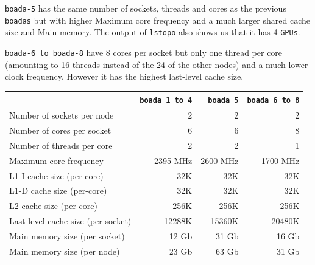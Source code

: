 \texttt{boada-5} has the same number of sockets, threads and cores as the previous \texttt{boadas} but with higher Maximum core frequency and a much larger shared cache size and Main memory.
The output of \texttt{lstopo} also shows us that it has 4 \texttt{GPUs}.

\texttt{boada-6 to boada-8} have 8 cores per socket but only one thread per core (amounting to 16 threads instead of the 24 of the other nodes) and a much lower clock frequency. However it has the
highest last-level cache size.

\begin{table}[H]%
    \label{tab:node_arch_and_mem}
    \centering
    \begin{tabular}{lrrr}

    \toprule
        & \texttt{boada 1 to 4} & \texttt{boada 5} & \texttt{boada 6 to 8} \\
    \midrule
        Number of sockets per node          & 2        & 2        & 2        \\
        Number of cores per socket          & 6        & 6        & 8        \\
        Number of threads per core          & 2        & 2        & 1        \\
        Maximum core frequency              & 2395 MHz & 2600 MHz & 1700 MHz \\
    \addlinespace[1em]
        L1-I cache size (per-core)          & 32K      & 32K      & 32K      \\
        L1-D cache size (per-core)          & 32K      & 32K      & 32K      \\
        L2 cache size (per-core)            & 256K     & 256K     & 256K     \\
        Last-level cache size (per-socket)  & 12288K   & 15360K   & 20480K   \\
    \addlinespace[1em]
        Main memory size (per socket)       & 12 Gb    & 31 Gb    & 16 Gb    \\
        Main memory size (per node)         & 23 Gb    & 63 Gb    & 31 Gb    \\
    \bottomrule

    \end{tabular}
\end{table}



